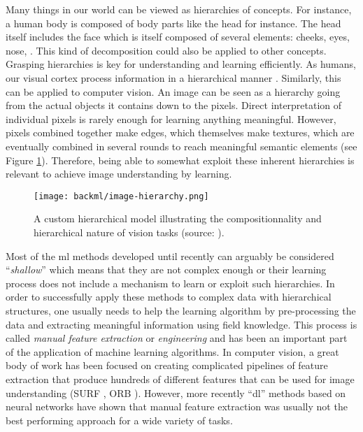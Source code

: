 Many things in our world can be viewed as hierarchies of concepts. For instance,
a human body is composed of body parts like the head for instance. The head itself
includes the face which is itself composed of several elements: cheeks, eyes,
nose, \etc. This kind of decomposition could also be applied to other concepts.
Grasping hierarchies is key for understanding and learning efficiently. As
humans, our visual cortex process information in a hierarchical manner
\parencite{van1994neural}. Similarly, this can be applied to computer vision. An
image can be seen as a hierarchy going from the actual objects it contains down
to the pixels. Direct interpretation of individual pixels is rarely enough for
learning anything meaningful. However, pixels combined together make edges, which
themselves make textures, which are eventually combined in several rounds to reach
meaningful semantic elements (see Figure \ref{fig:backml:hierarchy}). Therefore,
being able to somewhat exploit these inherent hierarchies is relevant to
achieve image understanding by learning.

\begin{figure}
  \centering
  \texttt{[image: backml/image-hierarchy.png]}
  \caption{A custom hierarchical model illustrating the compositionnality and hierarchical nature of vision tasks (source: \parencite{leonardis2010learning}).}
  \label{fig:backml:hierarchy}
\end{figure}

Most of the \acrlong{ml} methods developed until recently can arguably be considered
``\textit{shallow}'' which means that they are not complex enough or their learning
process does not include a mechanism to learn or exploit such hierarchies. In
order to successfully apply these methods to complex data with hierarchical
structures, one usually needs to help the learning algorithm by pre-processing
the data and extracting meaningful information using field knowledge. This process
is called \textit{manual feature extraction} or \textit{engineering} and has been
an important part of the application of machine learning algorithms. In computer
vision, a great body of work has been focused on creating complicated pipelines of
feature extraction that produce hundreds of different features that can be used
for image understanding (\eg SURF \parencite{bay2006surf}, ORB \parencite{rublee2011orb}).
However, more recently ``\acrlong{dl}'' methods based on neural networks have
shown that manual feature extraction was usually not the best performing approach
for a wide variety of tasks.


